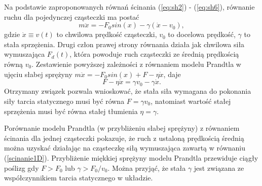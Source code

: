 \documentclass[12pt,a4paper,openright]{report} %
\begin{document}
Na podstawie zaproponowanych równań ścinania (\ref{eq:sh2}) - (\ref{eq:sh6}), równanie ruchu dla pojedynczej cząsteczki ma postać
% 
\begin{equation}
m \ddot{x}=-F_0 sin(x) - \gamma(\dot{x}-v_0),
\label{scinanie1D}
\end{equation}
%
gdzie $\dot{x} \equiv v(t)$ to chwilowa prędkość cząsteczki, $v_0$ to docelowa prędkość, $\gamma$ to stała sprzężenia. Drugi człon prawej strony równania działa jak chwilowa siła wymuszająca $F_d(t)$, która powoduje ruch cząsteczki ze średnią prędkością równą $v_0$. Zestawienie powyższej zależności z równaniem modelu Prandtla w ujęciu słabej sprężyny $m \ddot{x} = -F_0 sin(x) +F -\eta \dot{x}$, daje
\begin{equation}
F-\eta \dot{x} = \gamma v_0 - \gamma \dot{x}.
\end{equation}
Otrzymany związek pozwala wnioskować, że stała siła wymagana do pokonania siły tarcia statycznego musi być równa $F=\gamma v_0$, natomiast wartość stałej sprzężenia musi być równa stałej tłumienia $\eta = \gamma$. 

Porównanie modelu Prandtla (w przybliżeniu słabej sprężyny) z równaniem ścinania dla jednej cząsteczki pokazuje, że ruch z ustaloną prędkością średnią można uzyskać działając na cząsteczkę siłą wymuszająca zawartą w równaniu (\ref{scinanie1D}). Przybliżenie miękkiej sprężyny modelu Prandtla przewiduje ciągły poślizg gdy $F>F_0$ lub $\gamma > F_0 / v_0$. Można przyjąć, że stała $\gamma$ jest związana ze współczynnikiem tarcia statycznego w układzie.
\end{document}
